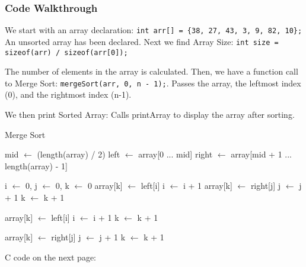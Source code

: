 \documentclass[a4paper,12pt]{article}
\begin{document}
\subsubsection{Code Walkthrough}

We start with an array declaration: \verb|int arr[] = {38, 27, 43, 3, 9, 82, 10};| An unsorted array has been declared. Next we find Array Size: \verb|int size = sizeof(arr) / sizeof(arr[0]);|

The number of elements in the array is calculated. Then, we have a function call to Merge Sort: \verb|mergeSort(arr, 0, n - 1);|. Passes the array, the leftmost index (0), and the rightmost index (n-1). 

We then print Sorted Array: Calls printArray to display the array after sorting.

\begin{algorithm}[H]
\caption{Merge Sort}
\begin{algorithmic}[1]
        \State mid $\gets$ (length(array) / 2)
        \State left $\gets$ array[0 ... mid]
        \State right $\gets$ array[mid + 1 ... length(array) - 1]
        
        \State {}
        \State {}
        
        \State {}
    \EndIf
\EndProcedure

    \State i $\gets$ 0, j $\gets$ 0, k $\gets$ 0
            \State array[k] $\gets$ left[i]
            \State i $\gets$ i + 1
        \Else
            \State array[k] $\gets$ right[j]
            \State j $\gets$ j + 1
        \EndIf
        \State k $\gets$ k + 1
    \EndWhile
    
        \State array[k] $\gets$ left[i]
        \State i $\gets$ i + 1
        \State k $\gets$ k + 1
    \EndWhile
    
        \State array[k] $\gets$ right[j]
        \State j $\gets$ j + 1
        \State k $\gets$ k + 1
    \EndWhile
\EndProcedure
\end{algorithmic}
\end{algorithm}

\begin{center}
    C code on the next page:
\end{center}
\end{document}
